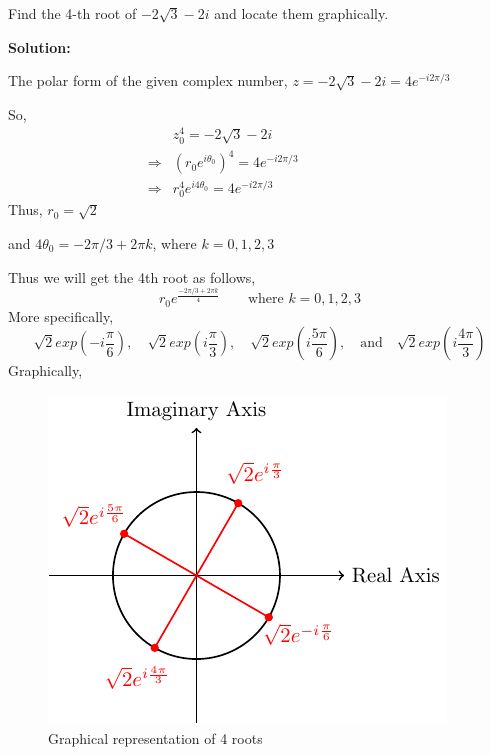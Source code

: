 \begin{ex}
    Find the 4-th root of $-2\sqrt{3}-2i$ and locate them graphically. \par 
    \noindent \textbf{Solution:} \par 
    \noindent The polar form of the given complex number, $\displaystyle z=-2\sqrt{3}-2i=4e^{-i2\pi/3}$\par 
\noindent So, \begin{align*}
    &z_0^4=-2\sqrt{3}-2i\hspace{3cm}\\
    \Rightarrow & (r_0e^{i\theta_0})^4=4e^{-i2\pi/3}\\
    \Rightarrow & r_0^4e^{i4\theta_0}=4e^{-i2\pi/3}
\end{align*}
Thus, $r_0=\sqrt{2}$ \par 
\noindent and $4\theta_0=-2\pi/3+2\pi k$, where $k=0,1,2,3$\par 
\noindent Thus we will get the 4th root as follows, 
$$r_0e^{\frac{-2\pi/3+2\pi k}{4}} \quad \quad \text{where }k=0,1,2,3$$
More specifically, 
$$\sqrt{2}exp\left(-i\frac{\pi}{6}\right),\quad \sqrt{2}exp\left(i\frac{\pi}{3}\right),\quad \sqrt{2}exp\left(i\frac{5\pi}{6}\right),\quad  \text{and}\quad \sqrt{2}exp\left(i\frac{4\pi}{3}\right)$$
Graphically, 
\begin{figure}[!ht]
    \centering
    \includegraphics{FIG_MAT215/FIG7.pdf}
    \caption{Graphical representation of 4 roots}
    \label{fig7}
\end{figure}
\FloatBarrier
\end{ex}
